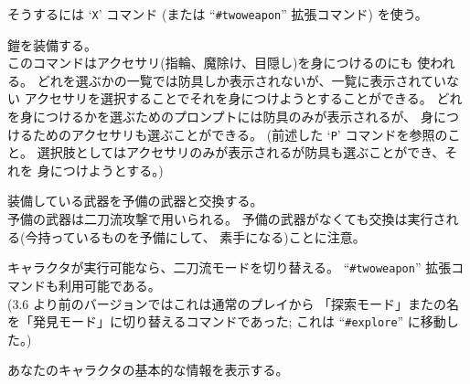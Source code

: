 そうするには `{\tt X}' コマンド
(または ``{\tt \#twoweapon}'' 拡張コマンド) を使う。
\item[\tb{W}]
鎧を装備する。\\
このコマンドはアクセサリ(指輪、魔除け、目隠し)を身につけるのにも
使われる。
どれを選ぶかの一覧では防具しか表示されないが、一覧に表示されていない
アクセサリを選択することでそれを身につけようとすることができる。
どれを身につけるかを選ぶためのプロンプトには防具のみが表示されるが、
身につけるためのアクセサリも選ぶことができる。
(前述した `{\tt P}' コマンドを参照のこと。
選択肢としてはアクセサリのみが表示されるが防具も選ぶことができ、それを
身につけようとする。)
\item[\tb{x}]
装備している武器を予備の武器と交換する。\\
予備の武器は二刀流攻撃で用いられる。
予備の武器がなくても交換は実行される(今持っているものを予備にして、
素手になる)ことに注意。
\item[\tb{X}]
キャラクタが実行可能なら、二刀流モードを切り替える。
``{\tt \#twoweapon}'' 拡張コマンドも利用可能である。\\
(3.6 より前のバージョンではこれは通常のプレイから
「探索モード」またの名を「発見モード」に切り替えるコマンドであった;
これは ``{\tt \#explore}'' に移動した。)
\item[\tb{\^{}X}]
あなたのキャラクタの基本的な情報を表示する。\\
